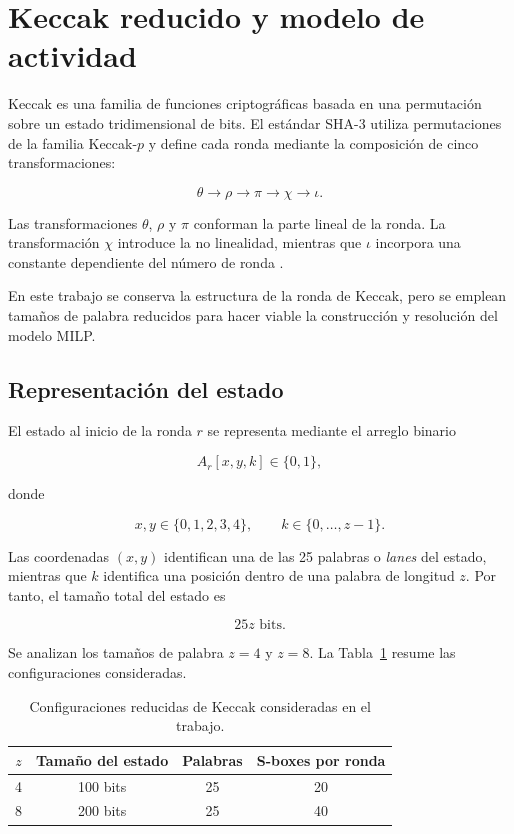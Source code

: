 \section{Keccak reducido y modelo de actividad}
\label{sec:keccak_reducido}

Keccak es una familia de funciones criptográficas basada en una permutación
sobre un estado tridimensional de bits. El estándar SHA-3 utiliza
permutaciones de la familia Keccak-$p$ y define cada ronda mediante la
composición de cinco transformaciones:

\[
\theta
\longrightarrow
\rho
\longrightarrow
\pi
\longrightarrow
\chi
\longrightarrow
\iota.
\]

Las transformaciones $\theta$, $\rho$ y $\pi$ conforman la parte lineal de
la ronda. La transformación $\chi$ introduce la no linealidad, mientras que
$\iota$ incorpora una constante dependiente del número de ronda
\cite{nist_fips202,bertoni2011keccak_reference}.

En este trabajo se conserva la estructura de la ronda de Keccak, pero se
emplean tamaños de palabra reducidos para hacer viable la construcción y
resolución del modelo MILP.


\subsection{Representación del estado}
\label{subsec:representacion_estado}

El estado al inicio de la ronda $r$ se representa mediante el arreglo
binario

\[
A_r[x,y,k] \in \{0,1\},
\]

donde

\[
x,y \in \{0,1,2,3,4\},
\qquad
k \in \{0,\ldots,z-1\}.
\]

Las coordenadas $(x,y)$ identifican una de las 25 palabras o
\emph{lanes} del estado, mientras que $k$ identifica una posición dentro
de una palabra de longitud $z$. Por tanto, el tamaño total del estado es

\[
25z \text{ bits}.
\]

Se analizan los tamaños de palabra $z=4$ y $z=8$. La
Tabla~\ref{tab:configuraciones_keccak} resume las configuraciones
consideradas.

\begin{table}[htbp]
    \centering
    \caption{Configuraciones reducidas de Keccak consideradas en el trabajo.}
    \label{tab:configuraciones_keccak}
    \begin{tabular}{cccc}
        \hline
        $z$ & Tamaño del estado & Palabras & S-boxes por ronda \\
        \hline
        4 & 100 bits & 25 & 20 \\
        8 & 200 bits & 25 & 40 \\
        \hline
    \end{tabular}
\end{table}

